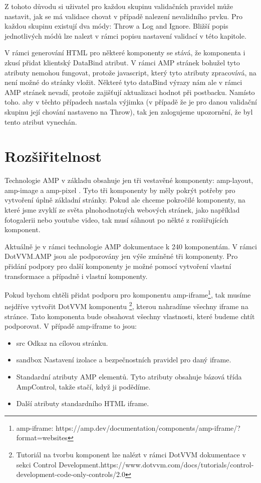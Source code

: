 Z tohoto důvodu si uživatel pro každou skupinu validačních pravidel může nastavit, jak se má validace chovat v případě nalezení nevalidního prvku. Pro každou skupinu existují dva módy: Throw a Log and Ignore. Bližší popis jednotlivých módů lze nalezt v rámci popisu nastavení validací v této kapitole.

V rámci generování HTML pro některé komponenty se stává, že komponenta i zkusí přidat klientský DataBind atribut. V rámci AMP stránek bohužel tyto atributy nemohou fungovat, protože javascript, který tyto atributy zpracovává, na není možné do stránky vložit. Některé tyto dataBind výrazy nám ale v rámci AMP stránek nevadí, protože zajišťují aktualizaci hodnot při postbacku. Namísto toho. aby v těchto případech nastala výjimka (v případě že je pro danou validační skupinu její chování nastaveno na Throw), tak jen zalogujeme upozornění, že byl tento atribut vynechán.

\section{Rozšiřitelnost}
Technologie AMP v základu obsahuje jen tři vestavěné komponenty: amp-layout, amp-image a amp-pixel \cite[Ch.\ 3, p.\ 160]{VzhuruDoAMP}. Tyto tři komponenty by měly pokrýt potřeby pro vytvoření úplně základní stránky. Pokud ale chceme pokročilé komponenty, na které jsme zvyklí ze světa plnohodnotných webových stránek, jako například fotogalerii nebo youtube video, tak musí sáhnout po někté z rozšiřujících komponent.

Aktuálně je v rámci technologie AMP dokumentace k 240 komponentám. V rámci DotVVM.AMP jsou ale podporovány jen výše zmíněné tři komponenty. Pro přidání podpory pro další komponenty je možné pomocí vytvoření vlastní transformace a případně i vlastní komponenty.

Pokud bychom chtěli přidat podporu pro komponentu amp-iframe\footnote{amp-iframe: https://amp.dev/documentation/components/amp-iframe/?format=websites}, tak musíme nejdříve vytvořit DotVVM komponentu \footnote{Tutoriál na tvorbu komponent lze nalézt v rámci DotVVM dokumentace v sekci Control Development.\newline https://www.dotvvm.com/docs/tutorials/control-development-code-only-controls/2.0}, kterou nahradíme všechny iframe na stránce. Tato komponenta bude obsahovat všechny vlastnosti, které budeme chtít podporovat. V případě amp-iframe to jsou:
\begin{itemize}
    \item src\newline
    Odkaz na cílovou stránku.
    \item sandbox\newline
    Nastavení izolace a bezpečnostních pravidel pro daný iframe.
    \item Standardní atributy AMP elementů.\newline
    Tyto atributy obsahuje bázová třída AmpControl, takže stačí, když ji podědíme.
    \item Další atributy standardního HTML iframe.
\end{itemize}

